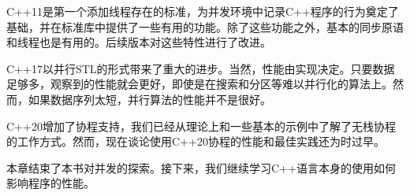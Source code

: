 C++11是第一个添加线程存在的标准，为并发环境中记录C++程序的行为奠定了基础，并在标准库中提供了一些有用的功能。除了这些功能之外，基本的同步原语和线程也是有用的。后续版本对这些特性进行了改进。

C++17以并行STL的形式带来了重大的进步。当然，性能由实现决定。只要数据足够多，观察到的性能就会更好，即使是在搜索和分区等难以并行化的算法上。然而，如果数据序列太短，并行算法的性能并不是很好。

C++20增加了协程支持，我们已经从理论上和一些基本的示例中了解了无栈协程的工作方式。然而，现在谈论使用C++20协程的性能和最佳实践还为时过早。

本章结束了本书对并发的探索。接下来，我们继续学习C++语言本身的使用如何影响程序的性能。